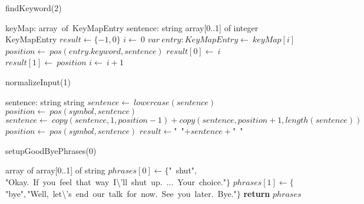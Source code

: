 \documentclass[a4paper,10pt]{article}
\begin{document}
\begin{algorithm}
\caption{findKeyword(2)}
\begin{algorithmic}[5]
\State {}
\State {}
\State {}
\State {}
\State {}
\State {}
    \State keyMap: array\ of\ KeyMapEntry
    \State sentence: string
  \EndDecl
    \State array[0..1] of integer
  \EndDecl
    \State KeyMapEntry
  \EndDecl
  \State \(result\gets\{-1,0\}\)
  \State \(i\gets\ 0\)
    \State \(var\ entry:KeyMapEntry\gets\ keyMap[i]\)
    \State \(position\gets\ pos(entry.keyword,sentence)\)
      \State \(result[0]\gets\ i\)
      \State \(result[1]\gets\ position\)
    \EndIf
    \State \(i\gets\ i+1\)
  \EndWhile
\EndFunction
\end{algorithmic}
\end{algorithm}


\begin{algorithm}
\caption{normalizeInput(1)}
\begin{algorithmic}[5]
\State {}
\State {}
\State {}
    \State sentence: string
  \EndDecl
    \State string
  \EndDecl
  \State \(sentence\gets\ lowercase(sentence)\)
    \State \(position\gets\ pos(symbol,sentence)\)
      \State \(sentence\gets\ copy(sentence,1,position-1)+copy(sentence,position+1,length(sentence))\)
      \State \(position\gets\ pos(symbol,sentence)\)
    \EndWhile
  \EndFor
  \State \(result\gets\)"{}\ "{}\(+sentence+\)"{}\ "{}\(\)
\EndFunction
\end{algorithmic}
\end{algorithm}


\begin{algorithm}
\caption{setupGoodByePhrases(0)}
\begin{algorithmic}[5]
    \State array of array[0..1] of string
  \EndDecl
  \State \(phrases[0]\gets\{\)"{}\ shut"{}\(,\)"{}Okay.\ If\ you\ feel\ that\ way\ I\textbackslash{}'{}ll\ shut\ up.\ ...\ Your\ choice."{}\(\}\)
  \State \(phrases[1]\gets\{\)"{}bye"{}\(,\)"{}Well,\ let\textbackslash{}'{}s\ end\ our\ talk\ for\ now.\ See\ you\ later.\ Bye."{}\(\}\)
  \State \textbf{return} \(phrases\)
\EndFunction
\end{algorithmic}
\end{algorithm}
\end{document}
